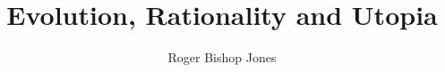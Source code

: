 \documentclass[10pt,a4paper,titlepage,openany,twocolumn]{book}
\begin{document}
\author{Roger Bishop Jones}
\title{Evolution, Rationality and Utopia}
\maketitle
\tableofcontents
\end{document}
